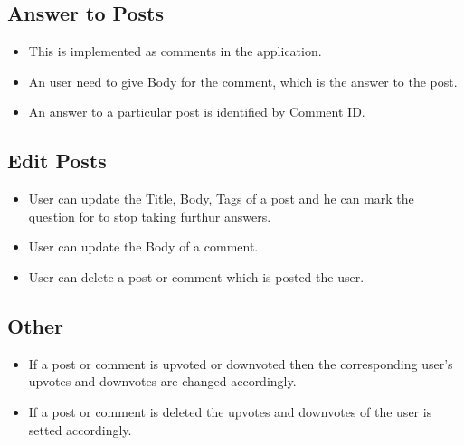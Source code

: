 \documentclass[12pt,a4paper]{article}
\begin{document}
\subsection{Answer to Posts}
\begin{itemize}
\item This is implemented as comments in the application.
\item An user need to give Body for the comment, which is the answer to the post.
\item An answer to a particular post is identified by Comment ID.
\end{itemize}

\subsection{Edit Posts}
\begin{itemize}
	\item User can update the Title, Body, Tags of a post and he can mark the question for to stop taking furthur answers.
	\item User can update the Body of a comment.
	\item User can delete a post or comment which is posted the user. 
\end{itemize}

\subsection{Other}
\begin{itemize}
	\item If a post or comment is upvoted or downvoted then the corresponding user's upvotes and downvotes are changed accordingly.
	\item If a post or comment is deleted the upvotes and downvotes of the user is setted accordingly.
\end{itemize}
\end{document}
